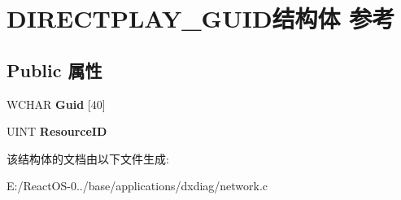 \hypertarget{struct_d_i_r_e_c_t_p_l_a_y___g_u_i_d}{}\section{D\+I\+R\+E\+C\+T\+P\+L\+A\+Y\+\_\+\+G\+U\+I\+D结构体 参考}
\label{struct_d_i_r_e_c_t_p_l_a_y___g_u_i_d}
\subsection*{Public 属性}
\begin{DoxyCompactItemize}
\item 
\mbox{\label{struct_d_i_r_e_c_t_p_l_a_y___g_u_i_d_a6f9bec5f35b2eedd26093da749126c2b}} 
W\+C\+H\+AR {\bfseries Guid} \mbox{[}40\mbox{]}
\item 
\mbox{\label{struct_d_i_r_e_c_t_p_l_a_y___g_u_i_d_ac42fe785c5a3d4281448d2b0b34c101c}} 
U\+I\+NT {\bfseries Resource\+ID}
\end{DoxyCompactItemize}


该结构体的文档由以下文件生成\+:\begin{DoxyCompactItemize}
\item 
E\+:/\+React\+O\+S-\/0../base/applications/dxdiag/network.\+c\end{DoxyCompactItemize}
